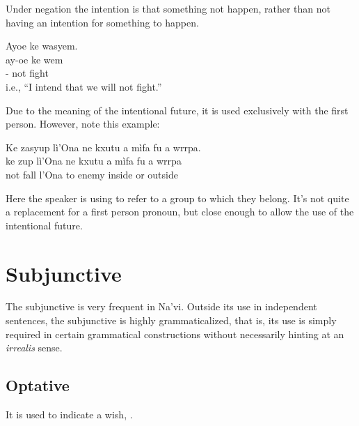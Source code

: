Under negation the intention is that something not happen, rather than
not having an intention for something to happen.

\begin{interlin}
\glll Ayoe ke wasyem. \\
     ay-oe ke wem \\
     - not fight \\
 i.e., ``I intend that we will not fight.''
\end{interlin}

Due to the meaning of the intentional future, it is used exclusively
with the first person.  However, note this example:

\begin{interlin}
  \glll Ke zasyup lì'Ona ne kxutu a mìfa fu a wrrpa. \\
   ke zup lì'Ona ne kxutu a mìfa fu a wrrpa \\
   not fall l'Ona to enemy  inside or  outside\\
 \Ipawl{}
\end{interlin}

\noindent Here the speaker is using   to refer to a
group to which they belong.  It's not quite a replacement for a first
person pronoun, but close enough to allow the use of the intentional
future.

\section{Subjunctive}
\noindent The subjunctive is very frequent in Na'vi.  Outside its use in
independent sentences, the sub\-junct\-ive is highly grammaticalized, that
is, its use is simply required in certain grammatical constructions
without necessarily hinting at an \textit{irrealis} sense.

\subsection{Optative} It is used to indicate a wish,  .

